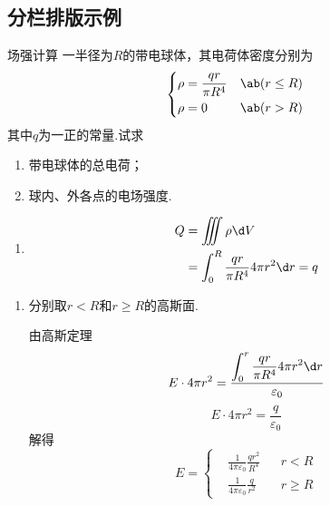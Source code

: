 \subsection{分栏排版示例}
{
\begin{multicols}{2}
\begin{exercise}{8}{场强计算}
    一半径为$R$的带电球体，其电荷体密度分别为
    $$\left\{
    \begin{aligned}
        &\rho=\frac{qr}{\pi R^4}&&\ab(r\le R)\\
        &\rho=0&&\ab(r>R)
    \end{aligned}\right.
    $$
    其中$q$为一正的常量.试求
    \begin{enumerate}
        \item 带电球体的总电荷；
        \item 球内、外各点的电场强度.
    \end{enumerate}
\end{exercise}
\begin{solution}
    \begin{enumerate}
        \item 
        $$
        \begin{aligned}
            Q&=\iiint{\rho\d V}\\
            &=\int_0^R{\frac{qr}{\pi R^4}4\pi r^2\d r}=q
        \end{aligned}
        $$
    \end{enumerate}
\end{solution}
\begin{soluting}
    \begin{enumerate}[label=2]
        \item 分别取$r<R$和$r\ge R$的高斯面.
        
        由高斯定理
        $$E\cdot 4\pi r^2=\frac{\displaystyle\int_0^r{\dfrac{qr}{\pi R^4}4\pi r^2\d r}}{\varepsilon_0}$$
        $$E\cdot 4\pi r^2=\frac{q}{\varepsilon_0}$$
        解得
        $$
        E=\left\{
            \begin{aligned}
                &\frac{1}{4\pi\varepsilon_0}\frac{qr^2}{R^4}&& r<R\\
                &\frac{1}{4\pi\varepsilon_0}\frac{q}{r^2}&& r\ge R
            \end{aligned}
        \right.$$
    \end{enumerate}
\end{soluting}
\end{multicols}
}